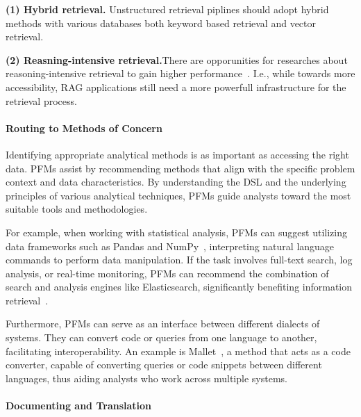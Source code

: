   
\begin{takeawaybox}
\textbf{(1) Hybrid retrieval. }Unstructured retrieval piplines should adopt hybrid methods with various databases both keyword based retrieval and vector retrieval. 

\textbf{(2) Reasning-intensive retrieval.}There are opporunities for researches about reasoning-intensive retrieval to gain higher performance~\cite{hongjin2024bright}. I.e., while towards more accessibility, RAG applications still need a more powerfull infrastructure for the retrieval process.
\end{takeawaybox}

  
  \paragraph{Routing to Methods of Concern}
  
  Identifying appropriate analytical methods is as important as accessing the right data. PFMs assist by recommending methods that align with the specific problem context and data characteristics. By understanding the DSL and the underlying principles of various analytical techniques, PFMs guide analysts toward the most suitable tools and methodologies.
  
  For example, when working with statistical analysis, PFMs can suggest utilizing data frameworks such as Pandas and NumPy~\cite{lai2023ds}, interpreting natural language commands to perform data manipulation. If the task involves full-text search, log analysis, or real-time monitoring, PFMs can recommend the combination of search and analysis engines like Elasticsearch, significantly benefiting information retrieval~\cite{zhu2024retrieval}.
  
  Furthermore, PFMs can serve as an interface between different dialects of systems. They can convert code or queries from one language to another, facilitating interoperability. An example is Mallet~\cite{ngom2024mallet}, a method that acts as a code converter, capable of converting queries or code snippets between different languages, thus aiding analysts who work across multiple systems.
  
  \paragraph{Documenting and Translation}
  

